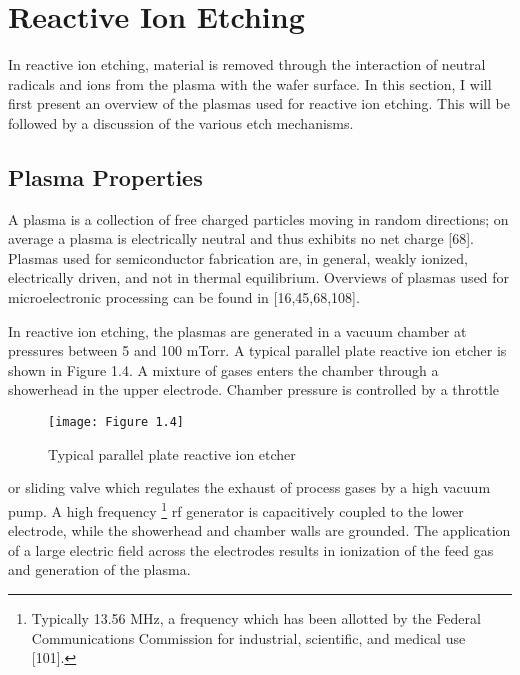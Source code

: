 \section{Reactive Ion Etching}

\tab In reactive ion etching, material is removed through the interaction of neutral radicals and ions from the plasma with the wafer surface. In this section, I will first present an overview of the plasmas used for reactive ion etching. This will be followed by a discussion of the various etch mechanisms.

\subsection{Plasma Properties}

\tab A plasma is a collection of free charged particles moving in random directions; on average a plasma is electrically neutral and thus exhibits no net charge [68]. Plasmas used for semiconductor fabrication are, in general, weakly ionized, electrically driven, and not in thermal equilibrium. Overviews of plasmas used for microelectronic processing can be found in [16,45,68,108].

In reactive ion etching, the plasmas are generated in a vacuum chamber at pressures between 5 and 100 mTorr. A typical parallel plate reactive ion etcher is shown in Figure 1.4. A
mixture of gases enters the chamber through a showerhead in the upper electrode. Chamber pressure is controlled by a throttle

\begin{figure}[H]
	\centering
	\texttt{[image: Figure 1.4]}
	\bf\caption{Typical parallel plate reactive ion etcher}
	\label{fig:1.4}
\end{figure}

\noindent or sliding valve which regulates the exhaust of process gases by a high vacuum pump. A high frequency \footnote{Typically 13.56 MHz, a frequency which has been allotted by the Federal Communications Commission for industrial, scientific, and medical use [101].} rf generator is capacitively coupled to the lower electrode, while the showerhead and chamber walls are grounded. The application of
a large electric field across the electrodes results in ionization of the feed gas and generation of the plasma.


